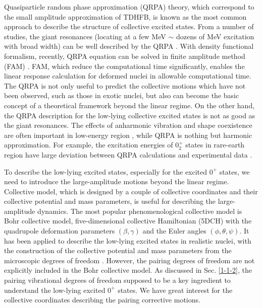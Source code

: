 \documentclass[11pt]{book} %
\begin{document}
Quasiparticle random phase approximation (QRPA) theory, which correspond to the small amplitude approximation of TDHFB, is known as the most common approach to describe the structure of collective excited states. From a number of studies, the giant resonances (locating at a few MeV $\sim$ dozens of MeV excitation with broad width) can be well described by the QRPA \cite{Eba10, YN11, YN13, SL13-2}. With density functional formalism, recently, QRPA equation can be solved in finite amplitude method (FAM) \cite{Na07}. FAM, which reduce the computational time significantly, enables the linear response calculation for deformed nuclei in allowable computational time. 
The QRPA is not only useful to predict the collective motions which have not been observed, such as those in exotic nuclei, but also can become the basic concept of a theoretical framework beyond the linear regime. On the other hand, the QRPA description for the low-lying collective excited states is not as good as the giant resonances. The effects of anharmonic vibration and shape coexistence are often important in low-energy region \cite{HW11}, while QRPA is nothing but harmonic approximation. For example, the excitation energies of $0_2^+$ states in rare-earth region have large deviation between QRPA calculations and experimental data \cite{TE11}. 

To describe the low-lying excited states, especially for the excited $0^+$ states, we need to introduce the large-amplitude motions beyond the linear regime.
Collective model, which is designed by a couple of collective coordinates and their collective potential and mass parameters, is useful for describing the large-amplitude dynamics. The most popular phenomenological collective model is Bohr collective model, five-dimensional collective Hamiltonian (5DCH) with the quadrupole deformation parameters $(\beta,\gamma)$ and the Euler angles $(\phi,\theta,\psi)$. It has been applied to describe the low-lying excited states in realistic nuclei, with the construction of the collective potential and mass parameters from the microscopic degrees of freedom \cite{NMMY16}. However, the pairing degrees of freedom are not explicitly included in the Bohr collective model. As discussed in Sec. \ref{1-1-2}, the pairing vibrational degrees of freedom supposed to be a key ingredient to understand the low-lying  excited $0^+$ states. We have great interest for the collective coordinates describing the pairing corrective motions.
\end{document}

